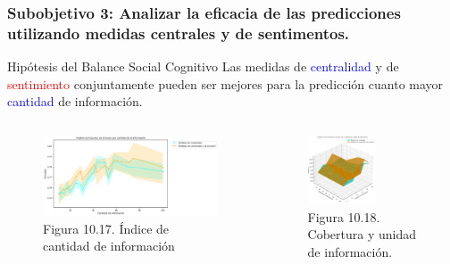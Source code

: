 \documentclass{beamer}
\begin{document}
\begin{frame}
	\frametitle{Subobjetivo 3: Analizar la eficacia de las predicciones utilizando medidas centrales y de sentimentos.}
\begin{block}{Hipótesis del Balance Social Cognitivo}
Las medidas de \textcolor{blue}{centralidad} y de \textcolor{red}{sentimiento} conjuntamente pueden ser mejores para la predicción cuanto mayor \textcolor{blue}{cantidad} de información.

\end{block}	
	\begin{columns}[c]
		\begin{column}{.5\textwidth}
			\begin{figure}
				\centering
				\includegraphics[width=1\textwidth]{figs/cap7/figura_55}
				\caption{Figura 10.17. Índice de cantidad de información}
			\end{figure}      
		\end{column}
		\begin{column}{.5\textwidth}
			\begin{figure}
				\centering
				\includegraphics[width=0.60\textwidth]{figs/cap7/figura_56}
			\caption{Figura 10.18. Cobertura y unidad de información.}
			\end{figure}
		\end{column}
	\end{columns}
	
\end{frame}
\end{document}
